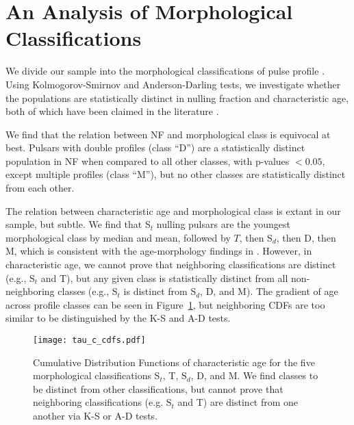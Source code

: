 \documentclass[fleqn,usenatbib]{mnras}
\begin{document}
\section{An Analysis of Morphological Classifications}
\label{sec: morphology}

We divide our sample into the morphological classifications of pulse profile \citep{Rankin1983}. Using Kolmogorov-Smirnov and Anderson-Darling tests, we investigate whether the populations are statistically distinct in nulling fraction and characteristic age, both of which have been claimed in the literature \citep[e.g., ][]{Hesse1974, Rankin1986}. 

We find that the relation between NF and morphological class is equivocal at best. Pulsars with double profiles (class ``D'') are a statistically distinct population in NF when compared to all other classes, with p-values $<0.05$, except multiple profiles (class ``M''), but no other classes are statistically distinct from each other.

The relation between characteristic age and morphological class is extant in our sample, but subtle. We find that S$_t$ nulling pulsars are the youngest morphological class by median and mean, followed by $T$, then S$_d$, then D, then M, which is consistent with the age-morphology findings in \citet{Rankin1986}. However, in characteristic age, we cannot prove that neighboring classifications are distinct (e.g., S$_t$ and T), but any given class is statistically distinct from all non-neighboring classes (e.g., S$_t$ is distinct from S$_d$, D, and M). The gradient of age across profile classes can be seen in Figure~\ref{fig:tauc_cdf}, but neighboring CDFs are too similar to be distinguished by the K-S and A-D tests.

\begin{figure} 
    \centering
    \texttt{[image: tau\_c\_cdfs.pdf]}
    \caption{Cumulative Distribution Functions of characteristic age for the five morphological classifications S$_t$, T, S$_d$, D, and M. We find classes to be distinct from other classifications, but cannot prove that neighboring classifications (e.g. S$_t$ and T) are distinct from one another via K-S or A-D tests.}
    \label{fig:tauc_cdf}
\end{figure}

\end{document}
